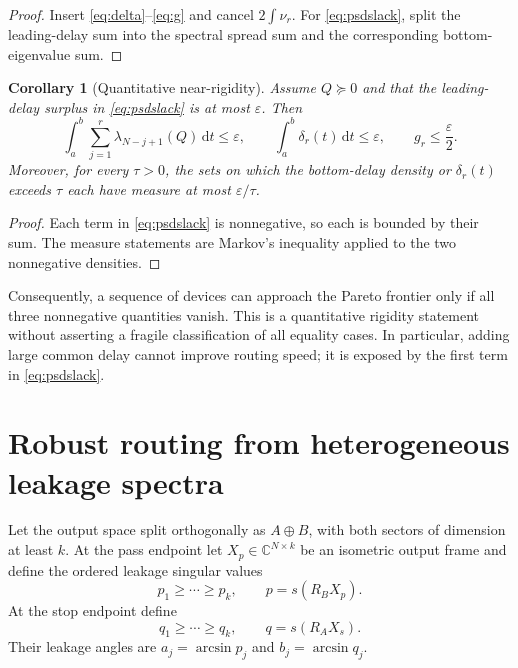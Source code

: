 \documentclass[11pt]{article}
\newtheorem{corollary}[theorem]{Corollary}
\theoremstyle{definition}
\theoremstyle{remark}
\newcommand{\C}{\mathbb C}
\newcommand{\dd}{\mathrm d}
\begin{document}
\begin{proof}
Insert \eqref{eq:delta}--\eqref{eq:g} and cancel $2\int\nu_r$.
For \eqref{eq:psdslack}, split the leading-delay sum into the spectral
spread sum and the corresponding bottom-eigenvalue sum.
\end{proof}

\begin{corollary}[Quantitative near-rigidity]\label{cor:stability}
Assume $Q\succeq0$ and that the leading-delay surplus in
\eqref{eq:psdslack} is at most $\varepsilon$.  Then
\begin{equation}\label{eq:stability}
 \int_a^b\sum_{j=1}^r\lambda_{N-j+1}(Q)\,\dd t\leq\varepsilon,
 \qquad
 \int_a^b\delta_r(t)\,\dd t\leq\varepsilon,
 \qquad
 g_r\leq\frac\varepsilon2.
\end{equation}
Moreover, for every $\tau>0$, the sets on which the bottom-delay density or
$\delta_r(t)$ exceeds $\tau$ each have measure at most
$\varepsilon/\tau$.
\end{corollary}

\begin{proof}
Each term in \eqref{eq:psdslack} is nonnegative, so each is bounded by their
sum.  The measure statements are Markov's inequality applied to the two
nonnegative densities.
\end{proof}

Consequently, a sequence of devices can approach the Pareto frontier only if
all three nonnegative quantities vanish.  This is a quantitative rigidity
statement without asserting a fragile classification of all equality cases.
In particular, adding large common delay cannot improve routing speed; it is
exposed by the first term in \eqref{eq:psdslack}.

\section{Robust routing from heterogeneous leakage spectra}

Let the output space split orthogonally as $A\oplus B$, with both sectors of
dimension at least $k$.  At the pass endpoint let $X_p\in\C^{N\times k}$ be
an isometric output frame and define the ordered leakage singular values
\begin{equation}
 p_1\geq\cdots\geq p_k,\qquad p=s(R_BX_p).
\end{equation}
At the stop endpoint define
\begin{equation}
 q_1\geq\cdots\geq q_k,\qquad q=s(R_AX_s).
\end{equation}
Their leakage angles are $a_j=\arcsin p_j$ and $b_j=\arcsin q_j$.
\end{document}
